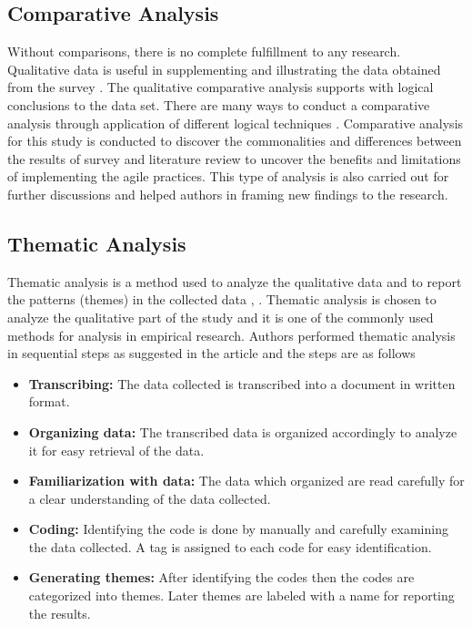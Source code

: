 \documentclass[a4paper,oneside]{bth}
\begin{document}
\subsection{Comparative Analysis}
Without comparisons, there is no complete fulfillment to any research. Qualitative data is useful in supplementing and illustrating the data obtained from the survey \cite{robson_real_2016}. The qualitative comparative analysis supports with logical conclusions to the data set. There are many ways to conduct a comparative analysis through application of different logical techniques \cite{robson_real_2016}. Comparative analysis for this study is conducted to discover the commonalities and differences between the results of survey and literature review to uncover the benefits and limitations of implementing the agile practices. This type of analysis is also carried out for further discussions and helped authors in framing new findings to the research.
\subsection{Thematic Analysis}
Thematic analysis is a method used to analyze the qualitative data and to report the patterns (themes) in the collected data \cite{lacey_qualitative_2001}, \cite{wohlin_towards_2015}. Thematic analysis is chosen to analyze the qualitative part of the study and it is one of the commonly used methods for analysis in empirical research. Authors performed thematic analysis in sequential steps as suggested in the article \cite{lacey_qualitative_2001} and the steps are as follows
\begin{itemize}
\item \textbf{Transcribing:} The data collected is transcribed into a document in written format.
\item \textbf{Organizing data:} The transcribed data is organized accordingly to analyze it for easy retrieval of the data.
\item \textbf{	Familiarization with data:} The data which organized are read carefully for a clear understanding of the data collected.
\item \textbf{Coding:} Identifying the code is done by manually and carefully examining the data collected. A tag is assigned to each code for easy identification.
\item \textbf{Generating themes:} After identifying the codes then the codes are categorized into themes. Later themes are labeled with a name for reporting the results.
\end{itemize}
\end{document}
